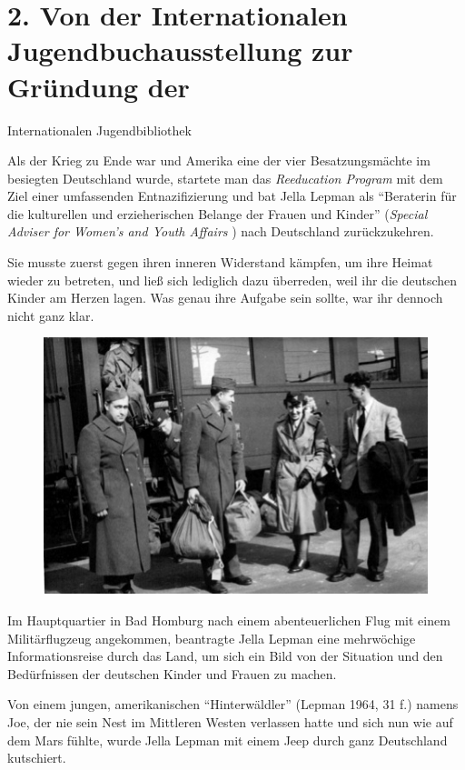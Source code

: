 \documentclass[a4paper,
fontsize=11pt,
oneside,
numbers=noperiodatend,
parskip=half-,
bibliography=totoc,
final
]{scrartcl}
\begin{document}
\section*{2. Von der Internationalen Jugendbuchausstellung zur
Gründung
der}\label{von-der-internationalen-jugendbuchausstellung-zur-gruxfcndung-der}

Internationalen Jugendbibliothek

Als der Krieg zu Ende war und Amerika eine der vier Besatzungsmächte im
besiegten Deutschland wurde, startete man das \emph{Reeducation Program}
mit dem Ziel einer umfassenden Entnazifizierung und bat Jella Lepman als
\enquote{Beraterin für die kulturellen und erzieherischen Belange der
Frauen und Kinder} (\emph{Special Adviser for Women's and Youth Affairs}
) nach Deutschland zurückzukehren.

Sie musste zuerst gegen ihren inneren Widerstand kämpfen, um ihre Heimat
wieder zu betreten, und ließ sich lediglich dazu überreden, weil ihr die
deutschen Kinder am Herzen lagen. Was genau ihre Aufgabe sein sollte,
war ihr dennoch nicht ganz klar.

\begin{figure}[htbp]
\centering
\includegraphics{img/bild2.jpg}
\end{figure}

Im Hauptquartier in Bad Homburg nach einem abenteuerlichen Flug mit
einem Militärflugzeug angekommen, beantragte Jella Lepman eine
mehrwöchige Informationsreise durch das Land, um sich ein Bild von der
Situation und den Bedürfnissen der deutschen Kinder und Frauen zu
machen.

Von einem jungen, amerikanischen \enquote{Hinterwäldler} (Lepman 1964,
31 f.) namens Joe, der nie sein Nest im Mittleren Westen verlassen hatte
und sich nun wie auf dem Mars fühlte, wurde Jella Lepman mit einem Jeep
durch ganz Deutschland kutschiert.~
\end{document}
